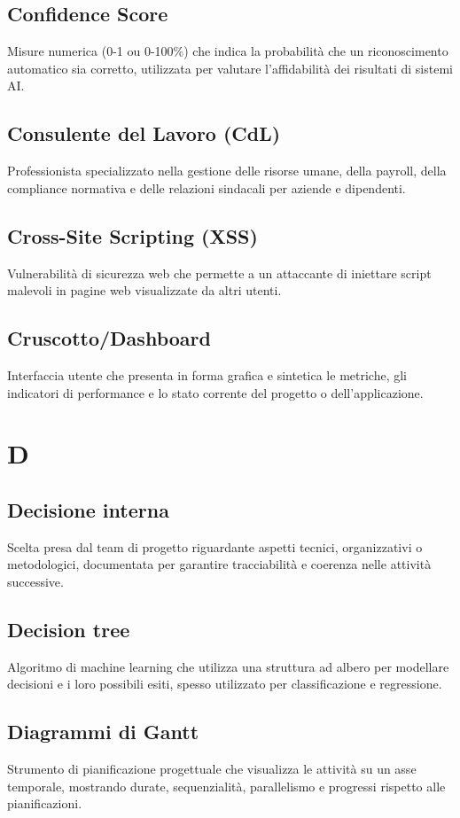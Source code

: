 \documentclass[a4paper,11pt]{article}
\begin{document}
\subsection{Confidence Score}
Misure numerica (0-1 ou 0-100\%) che indica la probabilità che un riconoscimento automatico sia corretto, utilizzata per valutare l'affidabilità dei risultati di sistemi AI.

\subsection{Consulente del Lavoro (CdL)}
Professionista specializzato nella gestione delle risorse umane, della payroll, della compliance normativa e delle relazioni sindacali per aziende e dipendenti.

\subsection{Cross-Site Scripting (XSS)}
Vulnerabilità di sicurezza web che permette a un attaccante di iniettare script malevoli in pagine web visualizzate da altri utenti.

\subsection{Cruscotto/Dashboard}
Interfaccia utente che presenta in forma grafica e sintetica le metriche, gli indicatori di performance e lo stato corrente del progetto o dell'applicazione.

\newpage
\section{D}

\subsection{Decisione interna}
Scelta presa dal team di progetto riguardante aspetti tecnici, organizzativi o metodologici, documentata per garantire tracciabilità e coerenza nelle attività successive.

\subsection{Decision tree}
Algoritmo di machine learning che utilizza una struttura ad albero per modellare decisioni e i loro possibili esiti, spesso utilizzato per classificazione e regressione.

\subsection{Diagrammi di Gantt}
Strumento di pianificazione progettuale che visualizza le attività su un asse temporale, mostrando durate, sequenzialità, parallelismo e progressi rispetto alle pianificazioni.
\end{document}
